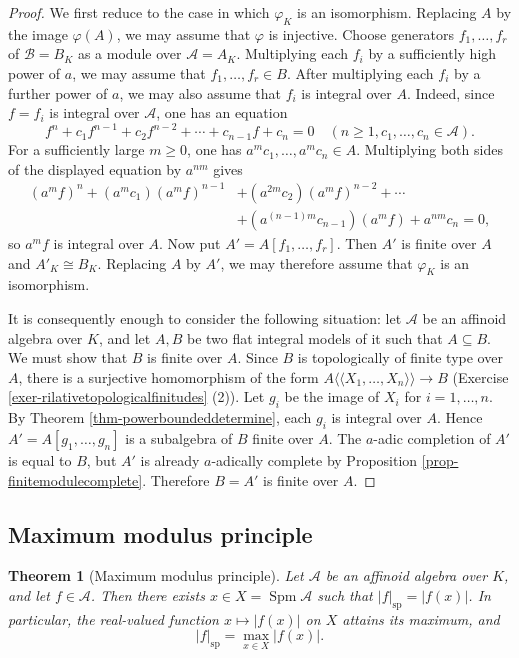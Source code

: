 \documentclass[a4paper,12pt, dvipdfmx]{jsbook}
\def\sp{\mathop{\mathrm{sp}}\nolimits}
\def\Spm{\mathop{\mathrm{Spm}}\nolimits}
\def\dl{\langle\!\langle}
\def\dr{\rangle\!\rangle}
\newcommand{\abs}[1]{\lvert#1\rvert}
\theoremstyle{plain}
\newtheorem{thm}{\bfseries Theorem}[section]
\theoremstyle{definition}
\begin{document}
\begin{proof}[Proof]
We first reduce to the case in which $\varphi_K$ is an isomorphism.
Replacing $A$ by the image $\varphi(A)$, we may assume that $\varphi$ is injective.
Choose generators $f_1,\ldots,f_r$ of $\mathcal{B}=B_K$ as a module over $\mathcal{A}=A_K$.
Multiplying each $f_i$ by a sufficiently high power of $a$, we may assume that $f_1,\ldots,f_r\in B$.
After multiplying each $f_i$ by a further power of $a$, we may also assume that $f_i$ is integral over $A$.
Indeed, since $f=f_i$ is integral over $\mathcal{A}$, one has an equation
$$
f^n+c_1f^{n-1}+c_2f^{n-2}+\cdots+c_{n-1}f+c_n=0\quad (n\geq 1,c_1,\ldots,c_n\in\mathcal{A}).
$$
For a sufficiently large $m\geq 0$, one has $a^mc_1,\ldots,a^mc_n\in A$.
Multiplying both sides of the displayed equation by $a^{nm}$ gives
\begin{equation*}
\begin{split}
(a^mf)^n+(a^mc_1)(a^mf)^{n-1}&+(a^{2m}c_2)(a^mf)^{n-2}+\cdots\\ &+(a^{(n-1)m}c_{n-1})(a^mf)+a^{nm}c_n=0,
\end{split}
\end{equation*}
so $a^mf$ is integral over $A$.
Now put $A'=A[f_1,\ldots,f_r]$. Then $A'$ is finite over $A$ and $A'_K\cong B_K$.
Replacing $A$ by $A'$, we may therefore assume that $\varphi_K$ is an isomorphism.

It is consequently enough to consider the following situation: let $\mathcal{A}$ be an affinoid algebra over $K$, and let $A,B$ be two flat integral models of it such that $A\subseteq B$.
We must show that $B$ is finite over $A$.
Since $B$ is topologically of finite type over $A$, there is a surjective homomorphism of the form $A\dl X_1,\ldots,X_n\dr\rightarrow B$ (Exercise \ref{exer-rilativetopologicalfinitudes} (2)).
Let $g_i$ be the image of $X_i$ for $i=1,\ldots,n$.
By Theorem \ref{thm-powerboundeddetermine}, each $g_i$ is integral over $A$.
Hence $A'=A[g_1,\ldots,g_n]$ is a subalgebra of $B$ finite over $A$.
The $a$-adic completion of $A'$ is equal to $B$, but $A'$ is already $a$-adically complete by Proposition \ref{prop-finitemodulecomplete}.
Therefore $B=A'$ is finite over $A$.
\end{proof}

\subsection{Maximum modulus principle}\label{sub-maximalprinciple}
\begin{thm}[Maximum modulus principle]\label{thm-maximalmodulusprinciple}{\rm 
Let $\mathcal{A}$ be an affinoid algebra over $K$, and let $f\in\mathcal{A}$.
Then there exists $x\in X=\Spm\mathcal{A}$ such that $\abs{f}_{\sp}=\abs{f(x)}$.
In particular, the real-valued function $x\mapsto\abs{f(x)}$ on $X$ attains its maximum, and
$$
\abs{f}_{\sp}=\max_{x\in X}\abs{f(x)}.
$$}
\end{thm}
\end{document}
